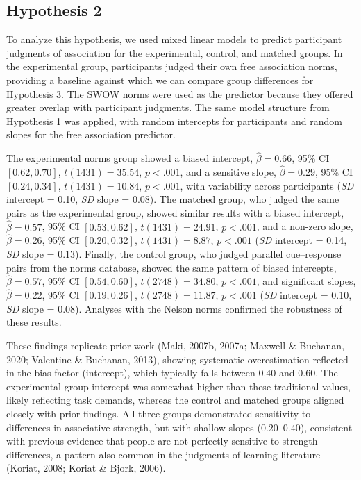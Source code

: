 \documentclass[
  man,floatsintext]{apa7}
\begin{document}
\subsection{Hypothesis 2}\label{hypothesis-2}

To analyze this hypothesis, we used mixed linear models to predict
participant judgments of association for the experimental, control, and
matched groups. In the experimental group, participants judged their own
free association norms, providing a baseline against which we can
compare group differences for Hypothesis 3. The SWOW norms were used as
the predictor because they offered greater overlap with participant
judgments. The same model structure from Hypothesis 1 was applied, with
random intercepts for participants and random slopes for the free
association predictor.

The experimental norms group showed a biased intercept,
\(\hat{\beta} = 0.66\), 95\% CI \([0.62, 0.70]\), \(t(1431) = 35.54\), \(p < .001\), and a sensitive slope,
\(\hat{\beta} = 0.29\), 95\% CI \([0.24, 0.34]\), \(t(1431) = 10.84\), \(p < .001\), with variability across
participants (\emph{SD} intercept = 0.10, \emph{SD} slope = 0.08). The matched
group, who judged the same pairs as the experimental group, showed
similar results with a biased intercept,
\(\hat{\beta} = 0.57\), 95\% CI \([0.53, 0.62]\), \(t(1431) = 24.91\), \(p < .001\), and a non-zero slope,
\(\hat{\beta} = 0.26\), 95\% CI \([0.20, 0.32]\), \(t(1431) = 8.87\), \(p < .001\) (\emph{SD} intercept = 0.14, \emph{SD}
slope = 0.13). Finally, the control group, who judged parallel
cue--response pairs from the norms database, showed the same pattern of
biased intercepts, \(\hat{\beta} = 0.57\), 95\% CI \([0.54, 0.60]\), \(t(2748) = 34.80\), \(p < .001\), and
significant slopes, \(\hat{\beta} = 0.22\), 95\% CI \([0.19, 0.26]\), \(t(2748) = 11.87\), \(p < .001\) (\emph{SD}
intercept = 0.10, \emph{SD} slope = 0.08). Analyses with the Nelson norms
confirmed the robustness of these results.

These findings replicate prior work (Maki, 2007b, 2007a; Maxwell \& Buchanan, 2020; Valentine \& Buchanan, 2013), showing systematic overestimation
reflected in the bias factor (intercept), which typically falls between
0.40 and 0.60. The experimental group intercept was somewhat higher than
these traditional values, likely reflecting task demands, whereas the
control and matched groups aligned closely with prior findings. All
three groups demonstrated sensitivity to differences in associative
strength, but with shallow slopes (0.20--0.40), consistent with previous
evidence that people are not perfectly sensitive to strength
differences, a pattern also common in the judgments of learning
literature (Koriat, 2008; Koriat \& Bjork, 2006).
\end{document}
